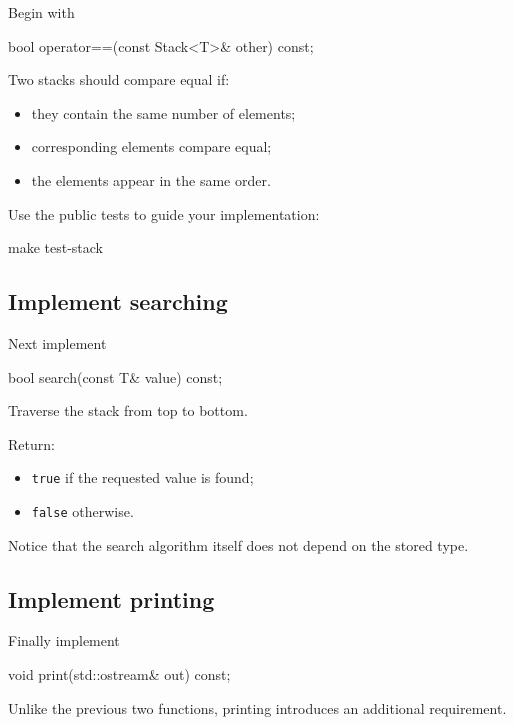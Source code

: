 \documentclass{csc2059practical}
\begin{document}
Begin with

\begin{cppcode}
bool operator==(const Stack<T>& other) const;
\end{cppcode}

Two stacks should compare equal if:

\begin{itemize}
    \item they contain the same number of elements;
    \item corresponding elements compare equal;
    \item the elements appear in the same order.
\end{itemize}

Use the public tests to guide your implementation:

\begin{terminal}
make test-stack
\end{terminal}

\subsection{Implement searching}

Next implement

\begin{cppcode}
bool search(const T& value) const;
\end{cppcode}

Traverse the stack from top to bottom.

Return:

\begin{itemize}
    \item \texttt{true} if the requested value is found;
    \item \texttt{false} otherwise.
\end{itemize}

Notice that the search algorithm itself does not depend on the stored type.

\subsection{Implement printing}

Finally implement

\begin{cppcode}
void print(std::ostream& out) const;
\end{cppcode}

Unlike the previous two functions, printing introduces an additional requirement.
\end{document}
